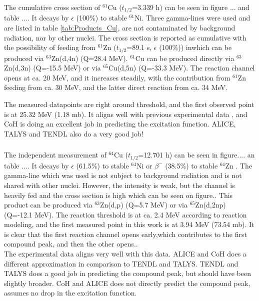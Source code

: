 \subsubsection{}
The cumulative cross section of $^{61}$Cu ($t_{1/2}$=3.339 h) \cite{Zuber2015} can be seen in figure ... and table .... It decays by $\epsilon$ (100\%) to stable $^{61}$Ni. Three gamma-lines were used and are listed in table \ref{tab:Products_Cu}, are not contaminated by background radiation, nor by other nuclei. The cross section is reported as cumulative with the possibility of feeding from $^{61}$Zn ($t_{1/2}$=89.1 s, $\epsilon$ (100\%)) inwhich can be produced via $^{63}$Zn(d,4n) (Q=28.4 MeV). $^{61}$Cu can be produced directly via $^{63}$Zn(d,3n) (Q=-15.5 MeV) or via $^{65}$Cu(d,5n) (Q=-33.3 MeV). The reaction channel opens at ca. 20 MeV, and it increases steadily, with the contribution from $^{61}$Zn feeding from ca. 30 MeV, and the latter direct reaction from ca. 34 MeV. 

The measured datapoints are right around threshold, and the first observed point is at 25.32 MeV (1.18 mb). It aligns well with previous experimental data \cite{Nakao2006,Diksic1979}, and CoH is doing an excellent job in predicting the excitation function. ALICE, TALYS and TENDL also do a very good job! 


\subsubsection{}
The independent measurement of $^{64}$Cu ($t_{1/2}$=12.701 h) can be seen in figure.... an table .... It decays by $\epsilon$ (61.5\%) to stable $^{64}$Ni or $\beta^-$ (38.5\%) to stable $^{64}$Zn \cite{Browne2010}. The gamma-line which was used is not subject to background radiation and is not shared with other nuclei. However, the intensity is weak, but the channel is heavily fed and the cross section is high which can be seen on figure.. This product can be produced via $^{63}$Zn(d,p) (Q=5.7 MeV) or via $^{65}$Zn(d,2np) (Q=-12.1 MeV). The reaction threshold is at ca. 2.4 MeV according to reaction modeling, and the first measured point in this work is at 3.94 MeV (73.54 mb). It is clear that the first reaction channel opens early,which contributes to the first compound peak, and then the other opens.. \\ 

The experimental data \cite{Simeckova2011, Bartell1950,Fulmer1970,Takacs2006a, Diksic1979,Khandaker2014,Bartell1950,Ochiai2007} aligns very well with this data. ALICE and CoH does a different approximation in comparison to TENDL and TALYS. TENDL and TALYS does a good job in predicting the compound peak, but should have been slightly broader. CoH and ALICE does not directly predict the compound peak, assumes no drop in the excitation function. 

